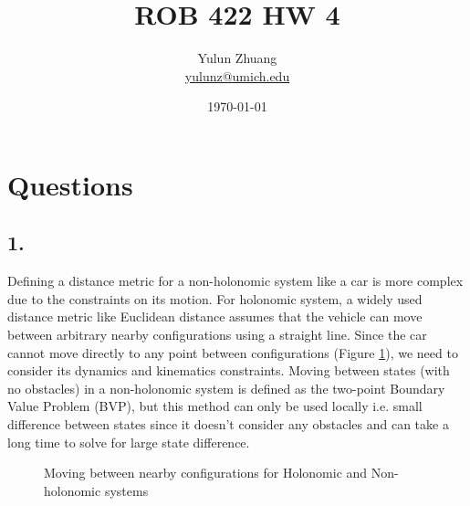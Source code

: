 \documentclass{article}
\title{ROB 422 HW 4}
\author{Yulun Zhuang \\ \href{mailto:yulunz@umich.edu}{yulunz@umich.edu}}
\date{\today}
\theoremstyle{definition} %
\begin{document}
\maketitle

\section*{Questions}
\subsection*{1.}

Defining a distance metric for a non-holonomic system like a car is more complex due to the constraints on its motion. For holonomic system, a widely used distance metric like Euclidean distance assumes that the vehicle can move between arbitrary nearby configurations using a straight line. Since the car cannot move directly to any point between configurations (Figure \ref{fig:nonholonomic}), we need to consider its dynamics and kinematics constraints. Moving between states (with no obstacles) in a non-holonomic system is defined as the two-point Boundary Value Problem (BVP), but this method can only be used locally i.e. small difference between states since it doesn't consider any obstacles and can take a long time to solve for large state difference.


\begin{figure}[H]
    \centering
    \quad
    \caption{Moving between nearby configurations for Holonomic and Non-holonomic systems}
    \label{fig:nonholonomic}
\end{figure}
\end{document}
